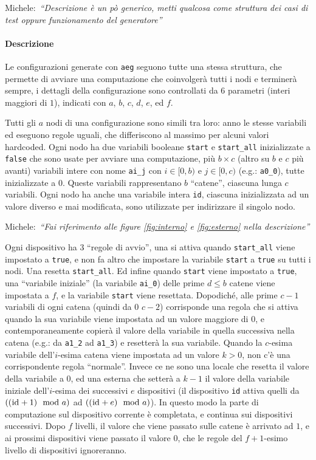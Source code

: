 \documentclass[12pt, a4paper]{article}
\newcommand{\michele}[1]{{\color{red}Michele:~}{\itshape``{#1}''}}
\newcommand{\aeg}[0]{{\lstinline{aeg}}\xspace}
\begin{document}
\michele{Descrizione è un pò generico, metti qualcosa come struttura dei casi di test oppure funzionamento del generatore}

\paragraph{Descrizione}\label{aeg:descrizione}

Le configurazioni generate con \aeg seguono tutte una stessa struttura, che permette di avviare una computazione che coinvolgerà tutti i nodi e terminerà sempre, i dettagli della configurazione sono controllati da $6$ parametri (interi maggiori di $1$), indicati con $a$, $b$, $c$, $d$, $e$, ed $f$.

Tutti gli $a$ nodi di una configurazione sono simili tra loro: anno le stesse variabili ed eseguono regole uguali, che differiscono al massimo per alcuni valori hardcoded. Ogni nodo ha due variabili booleane \lstinline{start} e \lstinline{start_all} inizializzate a \lstinline{false} che sono usate per avviare una computazione, più $b\times c$ (altro su $b$ e $c$ più avanti) variabili intere con nome \lstinline{ai_j} con $i\in [0,b)$ e $j\in [0,c)$ (e.g.: \lstinline{a0_0}), tutte inizializzate a $0$. Queste variabili rappresentano $b$ ``catene'', ciascuna lunga $c$ variabili. Ogni nodo ha anche una variabile intera \lstinline{id}, ciascuna inizializzata ad un valore diverso e mai modificata, sono utilizzate per indirizzare il singolo nodo.

\michele{Fai riferimento alle figure \ref{fig:interno} e \ref{fig:esterno} nella descrizione}

Ogni dispositivo ha 3 ``regole di avvio'', una si attiva quando \lstinline{start_all} viene impostato a \lstinline{true}, e non fa altro che impostare la variabile \lstinline{start} a \lstinline{true} su tutti i nodi. Una resetta \lstinline{start_all}. Ed infine quando \lstinline{start} viene impostato a \lstinline{true}, una ``variabile iniziale'' (la variabile \lstinline{ai_0}) delle prime $d\leq b$ catene viene impostata a $f$, e la variabile \lstinline{start} viene resettata.
Dopodiché, alle prime $c-1$ variabili di ogni catena (quindi da $0$ $c-2$) corrisponde una regola che si attiva quando la sua variabile viene impostata ad un valore maggiore di $0$, e contemporaneamente copierà il valore della variabile in quella successiva nella catena (e.g.: da \lstinline{a1_2} ad \lstinline{a1_3}) e resetterà la sua variabile.
Quando la $c$-esima variabile dell'$i$-esima catena viene impostata ad un valore $k>0$, non c'è una corrispondente regola ``normale''. Invece ce ne sono una locale che resetta il valore della variabile a $0$, ed una esterna che setterà a $k-1$ il valore della variabile iniziale dell'$i$-esima dei successivi $e$ dispositivi (il dispositivo \lstinline{id} attiva quelli da $((\text{\lstinline{id}}+1)\mod a)$ ad $((\text{\lstinline{id}}+e)\mod a)$). In questo modo la parte di computazione sul dispositivo corrente è completata, e continua sui dispositivi successivi.
Dopo $f$ livelli, il valore che viene passato sulle catene è arrivato ad $1$, e ai prossimi dispositivi viene passato il valore $0$, che le regole del $f+1$-esimo livello di dispositivi ignoreranno.
\end{document}
